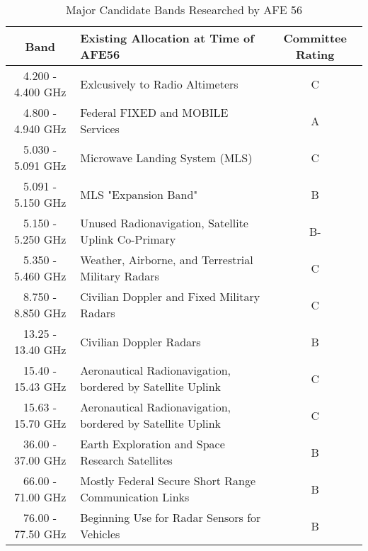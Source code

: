 \begin{table}[]
\centering
\begin{tabular}{@{}clc@{}}
\toprule
Band              & Existing Allocation at Time of AFE56                    & Committee Rating \\ \midrule
4.200 - 4.400 GHz & Exlcusively to Radio Altimeters                            & C                \\
4.800 - 4.940 GHz & Federal FIXED and MOBILE Services                          & A                \\
5.030 - 5.091 GHz & Microwave Landing System (MLS)                             & C                \\
5.091 - 5.150 GHz & MLS "Expansion Band"                                       & B                \\
5.150 - 5.250 GHz & Unused Radionavigation, Satellite Uplink Co-Primary        & B-               \\
5.350 - 5.460 GHz & Weather, Airborne, and Terrestrial Military Radars         & C                \\
8.750 - 8.850 GHz & Civilian Doppler and Fixed Military Radars                 & C                \\
13.25 - 13.40 GHz & Civilian Doppler Radars                                    & B                \\
15.40 - 15.43 GHz & Aeronautical Radionavigation, bordered by Satellite Uplink & C                \\
15.63 - 15.70 GHz & Aeronautical Radionavigation, bordered by Satellite Uplink & C                \\
36.00 - 37.00 GHz & Earth Exploration and Space Research Satellites            & B                \\
66.00 - 71.00 GHz & Mostly Federal Secure Short Range Communication Links             & B                \\
76.00 - 77.50 GHz & Beginning Use for Radar Sensors for Vehicles               & B                \\ \bottomrule
\end{tabular}
\caption{Major Candidate Bands Researched by AFE 56}
\label{tab:Candidates}
\end{table}



